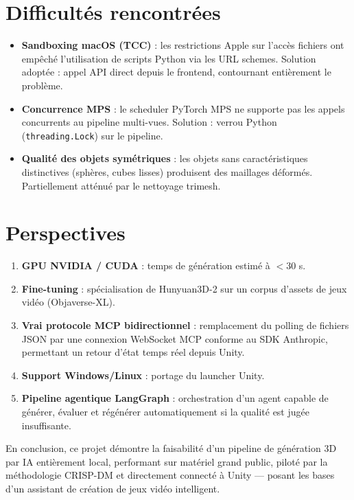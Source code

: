 \documentclass[12pt,a4paper,oneside]{report}
\begin{document}
\section*{Difficultés rencontrées}
\begin{itemize}
  \item \textbf{Sandboxing macOS (TCC)} : les restrictions Apple sur
    l'accès fichiers ont empêché l'utilisation de scripts Python via les
    URL schemes. Solution adoptée : appel API direct depuis le frontend,
    contournant entièrement le problème.
  \item \textbf{Concurrence MPS} : le scheduler PyTorch MPS ne supporte
    pas les appels concurrents au pipeline multi-vues. Solution : verrou
    Python (\texttt{threading.Lock}) sur le pipeline.
  \item \textbf{Qualité des objets symétriques} : les objets sans
    caractéristiques distinctives (sphères, cubes lisses) produisent
    des maillages déformés. Partiellement atténué par le nettoyage trimesh.
\end{itemize}

\section*{Perspectives}
\begin{enumerate}
  \item \textbf{GPU NVIDIA / CUDA} : temps de génération estimé à $<$30 s.
  \item \textbf{Fine-tuning} : spécialisation de Hunyuan3D-2 sur un corpus
    d'assets de jeux vidéo (Objaverse-XL).
  \item \textbf{Vrai protocole MCP bidirectionnel} : remplacement du polling
    de fichiers JSON par une connexion WebSocket MCP conforme au SDK Anthropic,
    permettant un retour d'état temps réel depuis Unity.
  \item \textbf{Support Windows/Linux} : portage du launcher Unity.
  \item \textbf{Pipeline agentique LangGraph} : orchestration d'un agent
    capable de générer, évaluer et régénérer automatiquement si la qualité
    est jugée insuffisante.
\end{enumerate}

En conclusion, ce projet démontre la faisabilité d'un pipeline de génération
3D par IA entièrement local, performant sur matériel grand public, piloté par
la méthodologie CRISP-DM et directement connecté à Unity — posant les bases
d'un assistant de création de jeux vidéo intelligent.
\end{document}
